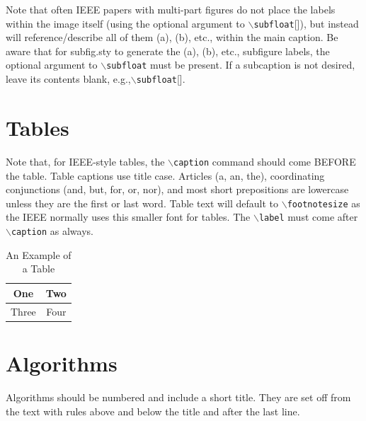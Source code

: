 Note that often IEEE papers with multi-part figures do not place the labels within the image itself (using the optional argument to $\backslash${\tt{subfloat}}[]), but instead will
 reference/describe all of them (a), (b), etc., within the main caption.
 Be aware that for subfig.sty to generate the (a), (b), etc., subfigure
 labels, the optional argument to $\backslash${\tt{subfloat}} must be present. If a
 subcaption is not desired, leave its contents blank,
 e.g.,$\backslash${\tt{subfloat}}[].


 

\section{Tables}
Note that, for IEEE-style tables, the
 $\backslash${\tt{caption}} command should come BEFORE the table. Table captions use title case. Articles (a, an, the), coordinating conjunctions (and, but, for, or, nor), and most short prepositions are lowercase unless they are the first or last word. Table text will default to $\backslash${\tt{footnotesize}} as
 the IEEE normally uses this smaller font for tables.
 The $\backslash${\tt{label}} must come after $\backslash${\tt{caption}} as always.
 
\begin{table}[!t]
\caption{An Example of a Table\label{tab:table1}}
\centering
\begin{tabular}{|c||c|}
\hline
One & Two\\
\hline
Three & Four\\
\hline
\end{tabular}
\end{table}

\section{Algorithms}
Algorithms should be numbered and include a short title. They are set off from the text with rules above and below the title and after the last line.

